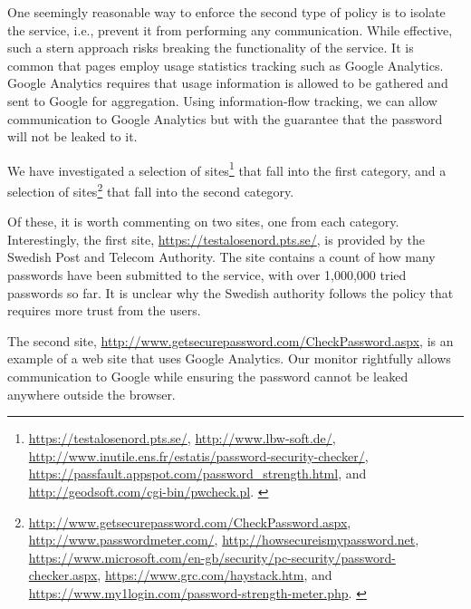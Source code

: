 \documentclass{llncs}
\begin{document}
One seemingly reasonable way to enforce the second type of policy is to
isolate the service, i.e., prevent it from performing any communication.
While effective, such a stern approach risks breaking the functionality of the service.
It is common that pages employ usage statistics tracking such as Google
Analytics. Google Analytics requires that usage information is allowed to be gathered and
sent to Google for aggregation. Using information-flow tracking, we
can allow communication to Google Analytics but with the guarantee
that the password will not be leaked to it.

We have investigated a selection of sites\footnote{\scriptsize{
\url{https://testalosenord.pts.se/},
\url{http://www.lbw-soft.de/},
\url{http://www.inutile.ens.fr/estatis/password-security-checker/},
\url{https://passfault.appspot.com/password_strength.html}, and
\url{http://geodsoft.com/cgi-bin/pwcheck.pl}.
}
}
that fall into the first category, and a selection of sites\footnote{\scriptsize{
\url{http://www.getsecurepassword.com/CheckPassword.aspx},
\url{http://www.passwordmeter.com/},
\url{http://howsecureismypassword.net},
\url{https://www.microsoft.com/en-gb/security/pc-security/password-checker.aspx},
\url{https://www.grc.com/haystack.htm}, and
\url{https://www.my1login.com/password-strength-meter.php}.
}
}
that fall into the second category.

Of these, it is worth commenting on two sites, one from each category.  Interestingly, the first
site, {\footnotesize{\url{https://testalosenord.pts.se/}}}, is provided by
the Swedish Post and Telecom Authority. The site contains a count of how many
passwords have been submitted to the service, with over 1,000,000 tried
passwords so far. It is unclear why the Swedish authority follows the policy
that requires more trust from the users.

The second
site, {\footnotesize{\url{http://www.getsecurepassword.com/CheckPassword.aspx}}}, is
an example of a web site that uses Google Analytics. Our monitor rightfully
allows communication to Google while ensuring the password cannot be leaked
anywhere outside the browser. 
\end{document}

